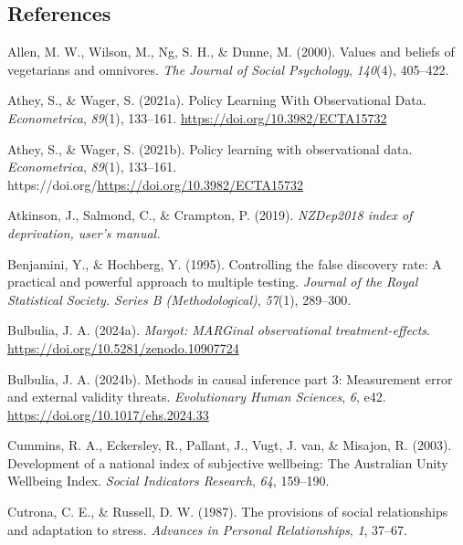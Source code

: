 \documentclass[
  single column]{article}
\newlength{\cslhangindent}
\newenvironment{CSLReferences}[2] %
 {\begin{list}{}{%
  \setlength{\itemindent}{0pt}
  \setlength{\leftmargin}{0pt}
  \setlength{\parsep}{0pt}
  \ifodd #1
   \setlength{\leftmargin}{\cslhangindent}
   \setlength{\itemindent}{-1\cslhangindent}
  \fi
  \setlength{\itemsep}{#2\baselineskip}}}
 {\end{list}}
\begin{document}
\newpage{}

\subsection*{References}\label{references}

\label{refs}
\begin{CSLReferences}{1}{0}
Allen, M. W., Wilson, M., Ng, S. H., \& Dunne, M. (2000). Values and
beliefs of vegetarians and omnivores. \emph{The Journal of Social
Psychology}, \emph{140}(4), 405--422.

Athey, S., \& Wager, S. (2021a). Policy Learning With Observational
Data. \emph{Econometrica}, \emph{89}(1), 133--161.
\url{https://doi.org/10.3982/ECTA15732}

Athey, S., \& Wager, S. (2021b). Policy learning with observational
data. \emph{Econometrica}, \emph{89}(1), 133--161.
https://doi.org/\url{https://doi.org/10.3982/ECTA15732}

Atkinson, J., Salmond, C., \& Crampton, P. (2019). \emph{NZDep2018 index
of deprivation, user{'}s manual.}

Benjamini, Y., \& Hochberg, Y. (1995). Controlling the false discovery
rate: A practical and powerful approach to multiple testing.
\emph{Journal of the Royal Statistical Society. Series B
(Methodological)}, \emph{57}(1), 289--300.

Bulbulia, J. A. (2024a). \emph{Margot: MARGinal observational
treatment-effects}. \url{https://doi.org/10.5281/zenodo.10907724}

Bulbulia, J. A. (2024b). Methods in causal inference part 3: Measurement
error and external validity threats. \emph{Evolutionary Human Sciences},
\emph{6}, e42. \url{https://doi.org/10.1017/ehs.2024.33}

Cummins, R. A., Eckersley, R., Pallant, J., Vugt, J. van, \& Misajon, R.
(2003). Development of a national index of subjective wellbeing: {The}
{Australian} {Unity} {Wellbeing} {Index}. \emph{Social Indicators
Research}, \emph{64}, 159--190.

Cutrona, C. E., \& Russell, D. W. (1987). The provisions of social
relationships and adaptation to stress. \emph{Advances in Personal
Relationships}, \emph{1}, 37--67.


\end{CSLReferences}
\end{document}
